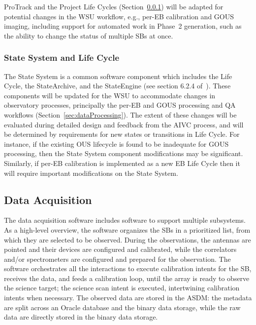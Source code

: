 \ac{ProTrack} and the Project Life Cycles (Section~\ref{sec:state-system}) will be adapted for potential changes in the WSU workflow, e.g., per-EB calibration and \ac{GOUS} imaging, including support for automated work in Phase~2 generation, such as the ability to change the status of multiple \acp{SB} at once.


\subsubsection{State System and Life Cycle}
\label{sec:state-system}

The State System is a common software component which includes the Life Cycle, the StateArchive, and the StateEngine (see section 6.2.4 of~\cite{CSA-IA}). These components will be updated for the WSU  to accommodate changes in observatory processes, principally the per-EB and GOUS processing and QA workflows (Section~\ref{sec:dataProcessing}). The extent of these changes will be evaluated during detailed design and feedback from the AIVC process, and will be determined by requirements for new states or transitions in Life Cycle. For instance, if the existing \ac{OUS} lifecycle is found to be inadequate for \ac{GOUS} processing, then the State System component modifications may be significant.  Similarly, if per-EB calibration is implemented as a new EB Life Cycle then it will require important modifications on the State System. 



\subsection{Data Acquisition}
\label{sec:data-acquisition}
The data acquisition software includes software to support multiple subsystems. As a high-level overview, the software organizes the SBs in a prioritized list, from which they are selected to be observed. During the observations, the antennas are pointed and their devices are configured and calibrated, while the correlators and/or spectrometers are configured and prepared for the observation. The software orchestrates all the interactions to execute calibration intents for the SB, receives the data, and feeds a calibration loop, until the array is ready to observe the science target; the science scan intent is executed, intertwining calibration intents when necessary. The observed data are stored in the ASDM: the metadata are split across an Oracle database and the binary data storage, while the raw data are directly stored in the binary data storage.

